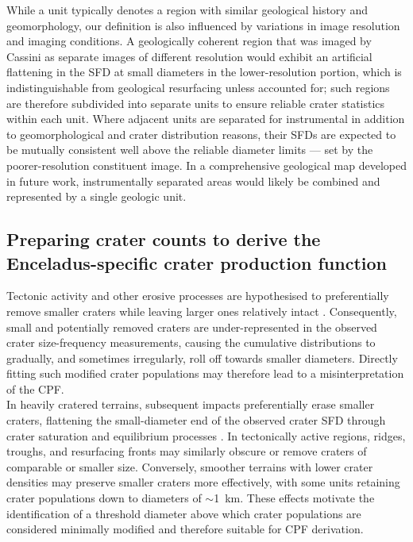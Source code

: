 \documentclass[preprint,11pt,3p,times,authoryear]{elsarticle}
\begin{document}
While a unit typically denotes a region with similar geological history and geomorphology, our definition is also influenced by variations in image resolution and imaging conditions. 
A geologically coherent region that was imaged by Cassini as separate images of different resolution would exhibit an artificial flattening in the SFD at small diameters in the lower-resolution portion, which is indistinguishable from geological resurfacing unless accounted for; such regions are therefore subdivided into separate units to ensure reliable crater statistics within each unit.
Where adjacent units are separated for instrumental in addition to geomorphological and crater distribution reasons, their SFDs are expected to be mutually consistent well above the reliable diameter limits --- set by the poorer-resolution constituent image. In a comprehensive geological map developed in future work, instrumentally separated areas would likely be combined and represented by a single geologic unit.\\ 



\subsection{Preparing crater counts to derive the Enceladus-specific crater production function}
\label{subsec:cpf}
Tectonic activity and other erosive processes are hypothesised to preferentially remove smaller craters while leaving larger ones relatively intact \citep{Michael2010}. Consequently, small and potentially removed craters are under-represented in the observed crater size-frequency measurements, causing the cumulative distributions to gradually, and sometimes irregularly, roll off towards smaller diameters. Directly fitting such modified crater populations may therefore lead to a misinterpretation of the CPF.\\

In heavily cratered terrains, subsequent impacts preferentially erase smaller craters, flattening the small-diameter end of the observed crater SFD through crater saturation and equilibrium processes \citep{DiSisto2016,Minton2019}. In tectonically active regions, ridges, troughs, and resurfacing fronts may similarly obscure or remove craters of comparable or smaller size. Conversely, smoother terrains with lower crater densities may preserve smaller craters more effectively, with some units retaining crater populations down to diameters of $\sim$1~km. These effects motivate the identification of a threshold diameter above which crater populations are considered minimally modified and therefore suitable for CPF derivation.\\
\end{document}

